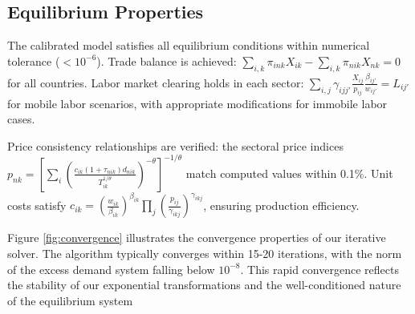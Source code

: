 \subsection{Equilibrium Properties}

The calibrated model satisfies all equilibrium conditions within numerical tolerance ($< 10^{-6}$). Trade balance is achieved: $\sum_{i,k} \pi_{ink} X_{ik} - \sum_{i,k} \pi_{nik} X_{nk} = 0$ for all countries. Labor market clearing holds in each sector: $\sum_{i,j} \gamma_{ijj'} \frac{X_{ij}}{p_{ij}} \frac{\beta_{ij'}}{w_{ij'}} = L_{ij'}$ for mobile labor scenarios, with appropriate modifications for immobile labor cases.

Price consistency relationships are verified: the sectoral price indices $p_{nk} = \left[\sum_{i} \left(\frac{c_{ik}(1+\tau_{nik})d_{nik}}{T_{ik}^{1/\theta}}\right)^{-\theta}\right]^{-1/\theta}$ match computed values within 0.1\%. Unit costs satisfy $c_{ik} = \left(\frac{w_{ik}}{\beta_{ik}}\right)^{\beta_{ik}} \prod_{j} \left(\frac{p_{ij}}{\gamma_{ikj}}\right)^{\gamma_{ikj}}$, ensuring production efficiency.

Figure \ref{fig:convergence} illustrates the convergence properties of our iterative solver. The algorithm typically converges within 15-20 iterations, with the norm of the excess demand system falling below $10^{-8}$. This rapid convergence reflects the stability of our exponential transformations and the well-conditioned nature of the equilibrium system